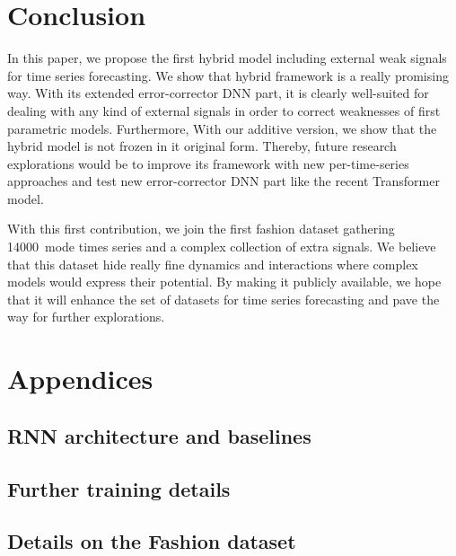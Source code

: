 \documentclass[letterpaper]{article} %
\newcommand{\numberts}{14000}
\begin{document}
\section{Conclusion}
\label{sec:discussion}
In this paper, we propose the first hybrid model including external weak signals for time series forecasting. We show that hybrid framework is a really promising way. With its extended error-corrector DNN part, it is clearly well-suited for dealing with any kind of external signals in order to correct weaknesses of first parametric models. Furthermore, With our additive version, we show that the hybrid model is not frozen in it original form. Thereby, future research explorations would be to improve its framework with new per-time-series approaches and test new error-corrector DNN part like the recent Transformer model.

With this first contribution, we join the first fashion dataset gathering \numberts\ mode times series and a complex collection of extra signals. We believe that this dataset hide really fine dynamics and interactions where complex models would express their potential. By making it publicly available, we hope that it will enhance the set of datasets for time series forecasting and pave the way for further explorations.



\section{Appendices}

\subsection{RNN architecture and baselines}
\label{section:architectures}

\subsection{Further training details}
\label{section:train_details}

\subsection{Details on the Fashion dataset}
\label{section:dataset_details}
\end{document}
